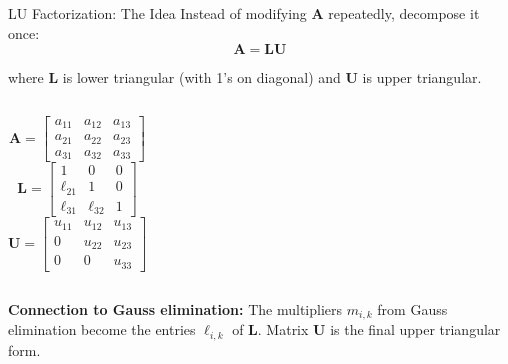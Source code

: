 \documentclass[aspectratio=169]{beamer}
\begin{document}
\begin{frame}{LU Factorization: The Idea}
	Instead of modifying $\mathbf{A}$ repeatedly, \alert{decompose it once}:
	\begin{equation*}
		\mathbf{A} = \mathbf{L} \mathbf{U}
	\end{equation*}

	where $\mathbf{L}$ is \alert{lower triangular} (with 1's on diagonal) and $\mathbf{U}$ is \alert{upper triangular}.

	\vspace{0.5cm}
	\begin{columns}
		\begin{equation*}
			\mathbf{A} = \begin{bmatrix}
				a_{11} & a_{12} & a_{13} \\
				a_{21} & a_{22} & a_{23} \\
				a_{31} & a_{32} & a_{33}
			\end{bmatrix}
		\end{equation*}
		\begin{equation*}
			\mathbf{L} = \begin{bmatrix}
				1         & 0         & 0 \\
				\ell_{21} & 1         & 0 \\
				\ell_{31} & \ell_{32} & 1
			\end{bmatrix}
		\end{equation*}
		\begin{equation*}
			\mathbf{U} = \begin{bmatrix}
				u_{11} & u_{12} & u_{13} \\
				0      & u_{22} & u_{23} \\
				0      & 0      & u_{33}
			\end{bmatrix}
		\end{equation*}
	\end{columns}

	\vspace{0.5cm}
	\textbf{Connection to Gauss elimination:} The multipliers $m_{i,k}$ from Gauss elimination become the entries $\ell_{i,k}$ of $\mathbf{L}$. Matrix $\mathbf{U}$ is the final upper triangular form.
\end{frame}
\end{document}
